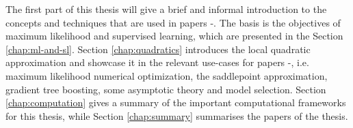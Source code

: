 The first part of this thesis will give a brief and informal introduction to the concepts and techniques that are used in papers -.
The basis is the objectives of maximum likelihood and supervised learning, which are presented in the Section \ref{chap:ml-and-sl}.
Section \ref{chap:quadratics} introduces the local quadratic approximation and showcase it in the relevant use-cases for papers -, i.e. maximum likelihood numerical optimization, the saddlepoint approximation, gradient tree boosting, some asymptotic theory and model selection.
Section \ref{chap:computation} gives a summary of the important computational frameworks for this thesis, while Section \ref{chap:summary} summarises the papers of the thesis.
%
%
%
%
%
%
%
%
%
%
%







